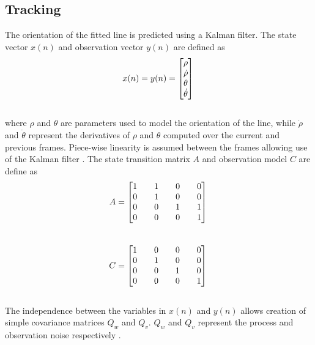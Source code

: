 \documentclass{article}
\begin{document}
\subsection{Tracking}
The orientation of the fitted line is predicted using a Kalman filter. The state vector $x(n)$ and observation vector $y(n)$ are defined as
\begin{equation}
x(n)= y(n)=\begin{bmatrix} \rho\\\dot{\rho}\\\theta\\\dot{\theta} \end{bmatrix}\\
\label{eq:state_measure_vectors}
\end{equation}\\
where $\rho$ and $\theta$ are parameters used to model the orientation of the line, while $\dot{\rho}$ and $\dot{\theta}$ represent the derivatives of $\rho$ and $\theta$ computed over the current and previous frames. Piece-wise linearity is assumed between the frames allowing use of the Kalman filter \cite{hayes_statistical_1996,brookner_tracking_1998}. The state transition matrix $A$ and observation model $C$ are define as
\begin{equation}
A = \begin{bmatrix} 1 && 1 && 0 && 0 \\ 0 && 1 && 0 && 0 \\ 0 && 0 && 1 && 1 \\ 0 && 0 && 0 && 1 \\\end{bmatrix}\\
\label{eq:state_trans}
\end{equation}\\
\begin{equation}
C = \begin{bmatrix} 1 && 0 && 0 && 0 \\ 0 && 1 && 0 && 0 \\ 0 && 0 && 1 && 0 \\ 0 && 0 && 0 && 1 \\\end{bmatrix}\\
\label{eq:observation_model}
\end{equation}\\
The independence between the variables in $x(n)$ and $y(n)$ allows creation of simple covariance matrices $Q_w$ and $Q_v$. $Q_w$ and $Q_v$ represent the process and observation noise respectively \cite{hayes_statistical_1996}.
\end{document}
